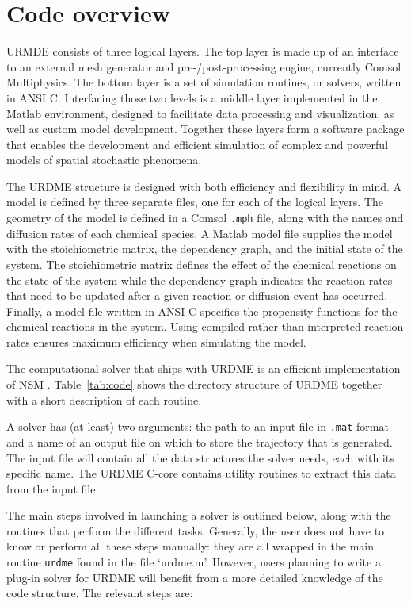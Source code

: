 \section{Code overview}
\label{sec:ov2}

URMDE consists of three logical layers. The top layer is made up of an
interface to an external mesh generator and pre-/post-processing
engine, currently Comsol Multiphysics. The bottom layer is a set
of simulation routines, or solvers, written in ANSI C. Interfacing
those two levels is a middle layer implemented in the Matlab
environment, designed to facilitate data processing and visualization,
as well as custom model development. Together these layers form a
software package that enables the development and efficient simulation
of complex and powerful models of spatial stochastic phenomena.

The URDME structure is designed with both efficiency and flexibility
in mind.  A model is defined by three separate files, one for each of
the logical layers. The geometry of the model is defined in a Comsol
\texttt{.mph} file, along with the names and diffusion rates of each
chemical species. A Matlab model file supplies the model with the
stoichiometric matrix, the dependency graph, and the initial state of
the system. The stoichiometric matrix defines the effect of the
chemical reactions on the state of the system while the dependency
graph indicates the reaction rates that need to be updated after a
given reaction or diffusion event has occurred. Finally, a model file
written in ANSI C specifies the propensity functions for the chemical
reactions in the system. Using compiled rather than interpreted
reaction rates ensures maximum efficiency when simulating the model.

The computational solver that ships with URDME is an efficient
implementation of NSM \cite{BISTAB}. Table~\ref{tab:code} shows the
directory structure of URDME together with a short description of each
routine.

A solver has (at least) two arguments: the path to an input file
in \texttt{.mat} format and a name of an output file on which to store
the trajectory that is generated. The input file will contain all the
data structures the solver needs, each with its specific name. The
URDME C-core contains utility routines to extract this data from the
input file.

The main steps involved in launching a solver is outlined below, along
with the routines that perform the different tasks. Generally, the
user does not have to know or perform all these steps manually: they
are all wrapped in the main routine \texttt{urdme} found in the file
`urdme.m'. However, users planning to write a plug-in solver for URDME
will benefit from a more detailed knowledge of the code structure. The
relevant steps are:

